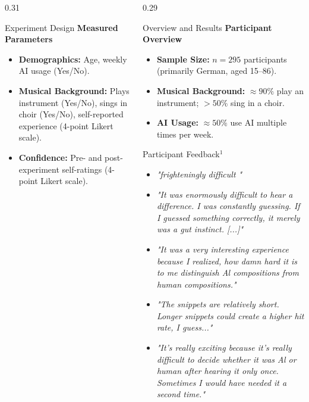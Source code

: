 \documentclass[final]{beamer}
\begin{document}
\begin{frame}[t]
\begin{columns}[t]
\begin{column}{0.31\textwidth}
\begin{block}{Experiment Design}
\vspace{0.5em}
\textbf{Measured Parameters}
\begin{itemize}
  \item \textbf{Demographics:} Age, weekly AI usage (Yes/No).
  \item \textbf{Musical Background:} Plays instrument (Yes/No), sings in choir (Yes/No), self-reported experience (4-point Likert scale).
  \item \textbf{Confidence:} Pre- and post-experiment self-ratings (4-point Likert scale).
\end{itemize}
  \end{block}
\end{column}
    \hfill
    \begin{column}{0.29\textwidth}
      \begin{block}{Overview and Results}
        \textbf{Participant Overview}
        \begin{itemize}
          \item \textbf{Sample Size:} $n = 295$ participants (primarily German, aged 15--86).
          \item \textbf{Musical Background:} $\approx 90\%$ play an instrument; $>50\%$ sing in a choir.
          \item \textbf{AI Usage:} $\approx 50\%$ use AI multiple times per week.
        \end{itemize}

        \vspace{0.3em}
      \end{block}
        \vspace{0.3em}
        \begin{block}{Participant Feedback$^1$}
          \small
          \begin{itemize}
            \item \textit{"frighteningly difficult "}
            \item \textit{"It was enormously difficult to hear a difference. I was constantly guessing. If I guessed
something correctly, it merely was a gut instinct. [...]"}
            \item \textit{"It was a very interesting experience because I realized, how damn hard it is to me distinguish Al
compositions from human compositions."}
            \item \textit{"The snippets are relatively short. Longer snippets could create a higher hit rate, I guess..."}
            \item \textit{"It's really exciting because it's really difficult to decide whether it was Al or human after hearing it
only once. Sometimes I would have needed it a second time."}
          \end{itemize}


\end{block}
\end{column}
\end{columns}
\end{frame}
\end{document}
